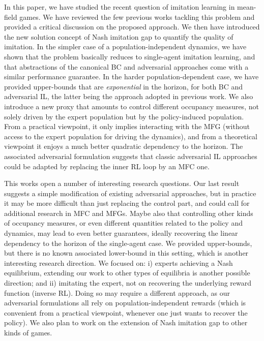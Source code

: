 \documentclass{article}
\begin{document}
In this paper, we have studied the recent question of imitation learning in mean-field games. We have reviewed the few previous works tackling this problem and provided a critical discussion on the proposed approach. We then have introduced the new solution concept of Nash imitation gap to quantify the quality of imitation. In the simpler case of a population-independent dynamics, we have shown that the problem basically reduces to single-agent imitation learning, and that abstractions of the canonical BC and adversarial approaches come with a similar performance guarantee. In the harder population-dependent case, we have provided upper-bounds that are \emph{exponential} in the horizon, for both BC and adversarial IL, the latter being the approach adopted in previous work. We also introduce a new proxy that amounts to control different occupancy measures, not solely driven by the expert population but by the policy-induced population. From a practical viewpoint, it only implies interacting with 
the MFG (without access to the expert population for driving the dynamics), and from a theoretical viewpoint it enjoys a much better quadratic dependency to the horizon. 
The associated adversarial formulation suggests that classic adversarial IL approaches could be adapted by replacing the inner RL loop by an MFC one.

This works open a number of interesting research questions. Our last result suggests a simple modification of existing adversarial approaches, but in practice it may be more difficult than just replacing the control part, and could call for additional research in MFC and MFGs. 
Maybe also that controlling other kinds of occupancy measures, or even different quantities related to the policy and dynamics, may lead to even better guarantees, ideally recovering the linear dependency to the horizon of the single-agent case. 
We provided upper-bounds, but there is no known associated lower-bound in this setting, which is another interesting research direction. 
We focused on: i) experts achieving a Nash equilibrium, extending our work to other types of equilibria is another possible direction; and ii) imitating the expert, not on recovering the underlying reward function (inverse RL). 
Doing so may require a different approach, as our adversarial formulations all rely on population-independent rewards (which is convenient from a practical viewpoint, whenever one just wants to recover the policy). 
We also plan to work on the extension of Nash imitation gap to other kinds of games.
\end{document}
